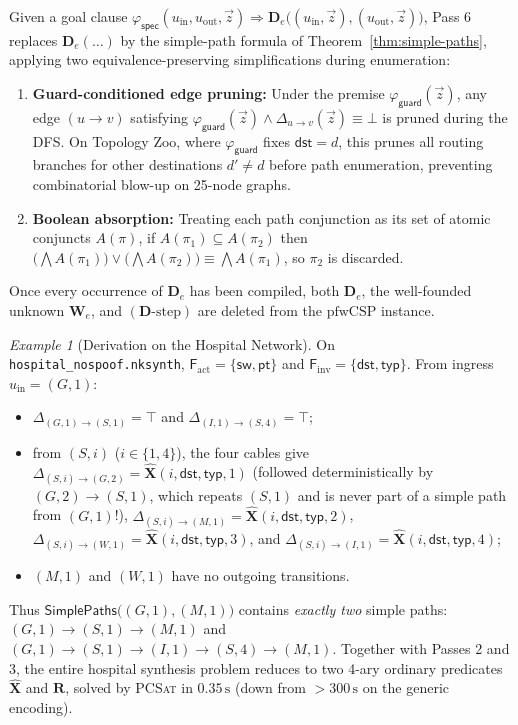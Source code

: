 \documentclass[11pt,a4paper]{article}
\theoremstyle{definition}
\theoremstyle{remark}
\newtheorem{example}[theorem]{Example}
\begin{document}
Given a goal clause $\varphi_{\mathsf{spec}}(u_{\mathrm{in}}, u_{\mathrm{out}}, \vec{z}) \Rightarrow
\mathbf{D}_e\bigl((u_{\mathrm{in}}, \vec{z}), (u_{\mathrm{out}}, \vec{z})\bigr)$, Pass 6 replaces
$\mathbf{D}_e(\dots)$ by the simple-path formula of Theorem~\ref{thm:simple-paths}, applying two
equivalence-preserving simplifications during enumeration:
\begin{enumerate}[label=(\arabic*)]
  \item \textbf{Guard-conditioned edge pruning:} Under the premise $\varphi_{\mathsf{guard}}(\vec{z})$,
        any edge $(u \to v)$ satisfying $\varphi_{\mathsf{guard}}(\vec{z}) \land \Delta_{u \to v}(\vec{z}) \equiv \bot$
        is pruned during the DFS. On Topology Zoo, where $\varphi_{\mathsf{guard}}$ fixes
        $\mathsf{dst} = d$, this prunes all routing branches for other destinations $d' \neq d$
        before path enumeration, preventing combinatorial blow-up on 25-node graphs.
  \item \textbf{Boolean absorption:} Treating each path conjunction as its set of atomic conjuncts
        $A(\pi)$, if $A(\pi_1) \subseteq A(\pi_2)$ then
        $\bigl(\bigwedge A(\pi_1)\bigr) \lor \bigl(\bigwedge A(\pi_2)\bigr) \equiv \bigwedge A(\pi_1)$,
        so $\pi_2$ is discarded.
\end{enumerate}
Once every occurrence of $\mathbf{D}_e$ has been compiled, both $\mathbf{D}_e$, the well-founded
unknown $\mathbf{W}_e$, and $(\mathbf{D}\text{-step})$ are deleted from the $\text{pfwCSP}$ instance.

\begin{example}[Derivation on the Hospital Network]
On \texttt{hospital\_nospoof.nksynth}, $\mathsf{F}_{\mathrm{act}} = \{\mathsf{sw}, \mathsf{pt}\}$
and $\mathsf{F}_{\mathrm{inv}} = \{\mathsf{dst}, \mathsf{typ}\}$. From ingress $u_{\mathrm{in}} = (G, 1)$:
\begin{itemize}
  \item $\Delta_{(G,1) \to (S,1)} = \top$ and $\Delta_{(I,1) \to (S,4)} = \top$;
  \item from $(S, i)$ ($i \in \{1, 4\}$), the four cables give
        $\Delta_{(S,i) \to (G,2)} = \widehat{\mathbf{X}}(i, \mathsf{dst}, \mathsf{typ}, 1)$
        (followed deterministically by $(G,2) \to (S,1)$, which repeats $(S,1)$ and is never part
        of a simple path from $(G,1)$!),
        $\Delta_{(S,i) \to (M,1)} = \widehat{\mathbf{X}}(i, \mathsf{dst}, \mathsf{typ}, 2)$,
        $\Delta_{(S,i) \to (W,1)} = \widehat{\mathbf{X}}(i, \mathsf{dst}, \mathsf{typ}, 3)$, and
        $\Delta_{(S,i) \to (I,1)} = \widehat{\mathbf{X}}(i, \mathsf{dst}, \mathsf{typ}, 4)$;
  \item $(M, 1)$ and $(W, 1)$ have no outgoing transitions.
\end{itemize}
Thus $\mathsf{SimplePaths}\bigl((G,1), (M,1)\bigr)$ contains \emph{exactly two} simple paths:
$(G,1) \to (S,1) \to (M,1)$ and $(G,1) \to (S,1) \to (I,1) \to (S,4) \to (M,1)$. Together with
Passes 2 and 3, the entire hospital synthesis problem reduces to two 4-ary ordinary predicates
$\widehat{\mathbf{X}}$ and $\mathbf{R}$, solved by \textsc{PCSat} in $0.35\,\text{s}$ (down from
$>300\,\text{s}$ on the generic encoding).
\end{example}
\end{document}
